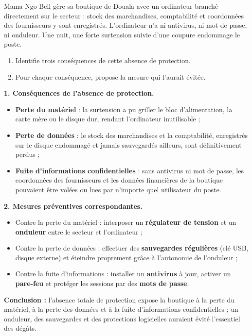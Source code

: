 \documentclass[11pt]{article}
\begin{document}
\begin{exoresolu}
Mama Ngo Bell gère sa boutique de Douala avec un ordinateur branché directement sur le secteur : stock des marchandises, comptabilité et coordonnées des fournisseurs y sont enregistrés. L'ordinateur n'a ni antivirus, ni mot de passe, ni onduleur. Une nuit, une forte surtension suivie d'une coupure endommage le poste.
\begin{enumerate}
\item Identifie trois conséquences de cette absence de protection.
\item Pour chaque conséquence, propose la mesure qui l'aurait évitée.
\end{enumerate}
\tcblower
\textbf{1. Conséquences de l'absence de protection.}
\begin{itemize}
\item \textbf{Perte du matériel} : la surtension a pu griller le bloc d'alimentation, la carte mère ou le disque dur, rendant l'ordinateur inutilisable ;
\item \textbf{Perte de données} : le stock des marchandises et la comptabilité, enregistrés sur le disque endommagé et jamais sauvegardés ailleurs, sont définitivement perdus ;
\item \textbf{Fuite d'informations confidentielles} : sans antivirus ni mot de passe, les coordonnées des fournisseurs et les données financières de la boutique pouvaient être volées ou lues par n'importe quel utilisateur du poste.
\end{itemize}
\textbf{2. Mesures préventives correspondantes.}
\begin{itemize}
\item Contre la perte du matériel : interposer un \textbf{régulateur de tension} et un \textbf{onduleur} entre le secteur et l'ordinateur ;
\item Contre la perte de données : effectuer des \textbf{sauvegardes régulières} (clé USB, disque externe) et éteindre proprement grâce à l'autonomie de l'onduleur ;
\item Contre la fuite d'informations : installer un \textbf{antivirus} à jour, activer un \textbf{pare-feu} et protéger les sessions par des \textbf{mots de passe}.
\end{itemize}
\textbf{Conclusion :} l'absence totale de protection expose la boutique à la perte du matériel, à la perte des données et à la fuite d'informations confidentielles ; un onduleur, des sauvegardes et des protections logicielles auraient évité l'essentiel des dégâts.
\end{exoresolu}
\end{document}
